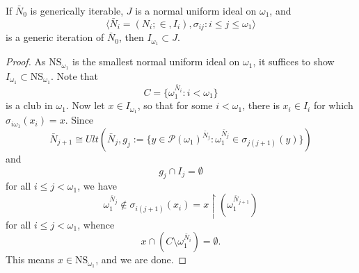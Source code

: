 \documentclass[12pt]{article}
\numberwithin{equation}{section}
\begin{document}
\begin{lem}\label{gisubset}
If $\bar{N}_0$ is generically iterable, $J$ is a normal uniform ideal on $\omega_1$, and $$\langle \bar{N}_i = (N_i; \in, I_i), \sigma_{ij} : i \leq j \leq \omega_1 \rangle$$ is a generic iteration of $\bar{N}_0$, then $I_{\omega_1} \subset J$.
\end{lem}
\begin{proof}
As $\mathrm{NS}_{\omega_1}$ is the smallest normal uniform ideal on $\omega_1$, it suffices to show $I_{\omega_1} \subset \mathrm{NS}_{\omega_1}$. Note that $$C = \{\omega_1^{\bar{N}_i} : i < \omega_1\}$$ is a club in $\omega_1$. Now let $x \in I_{\omega_1}$, so that for some $i < \omega_1$, there is $x_i \in I_i$ for which $\sigma_{i\omega_1}(x_i) = x$. Since 
\begin{equation*}
    \bar{N}_{j+1} \cong Ult(\bar{N}_j, g_j := \{y \in \mathcal{P}(\omega_1)^{\bar{N}_j} : \omega_1^{\bar{N}_j} \in \sigma_{j(j+1)}(y)\})
\end{equation*}
and
\begin{equation*}
    g_j \cap I_j = \emptyset
\end{equation*}
for all $i \leq j < \omega_1$, we have 
\begin{equation*}
    \omega_1^{\bar{N}_j} \not\in \sigma_{i(j+1)}(x_i) = x \restriction (\omega_1^{\bar{N}_{j+1}}) 
\end{equation*}
for all $i \leq j < \omega_1$, whence $$x \cap (C \setminus \omega_1^{\bar{N}_i}) = \emptyset.$$ This means $x \in \mathrm{NS}_{\omega_1}$, and we are done.
\end{proof}
\end{document}
